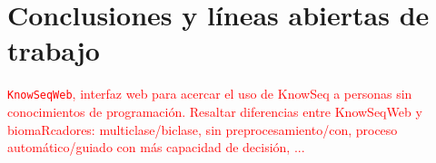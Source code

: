 \chapter{Conclusiones y líneas abiertas de trabajo}

\textcolor{red}{\texttt{KnowSeqWeb}, interfaz web para acercar el uso de KnowSeq a personas sin conocimientos de programación. Resaltar diferencias entre KnowSeqWeb y biomaRcadores: multiclase/biclase, sin preprocesamiento/con, proceso automático/guiado con más capacidad de decisión, ...}

